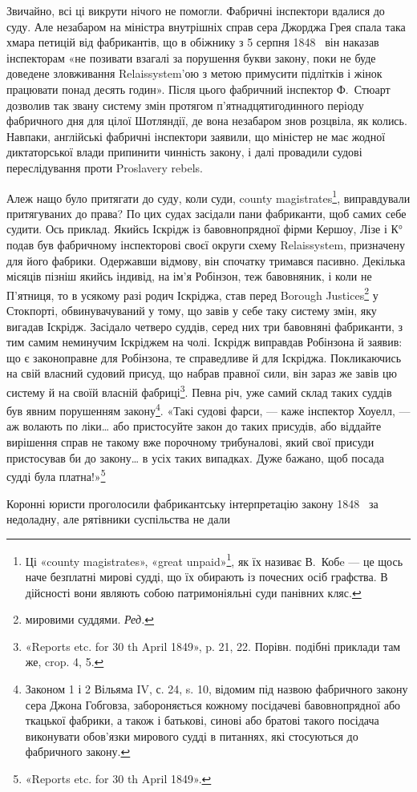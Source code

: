 
Звичайно, всі ці викрути нічого не помогли. Фабричні інспектори
вдалися до суду. Але незабаром на міністра внутрішніх
справ сера Джорджа Грея спала така хмара петицій від фабрикантів,
що в обіжнику з 5 серпня 1848~ він наказав інспекторам
«не позивати взагалі за порушення букви закону, поки не буде
доведене зловживання Relaissystem’ою з метою примусити підлітків
і жінок працювати понад десять годин». Після цього фабричний
інспектор Ф.~Стюарт дозволив так звану систему змін протягом
п’ятнадцятигодинного періоду фабричного дня для цілої Шотляндії,
де вона незабаром знов розцвіла, як колись. Навпаки,
англійські фабричні інспектори заявили, що міністер не має
жодної диктаторської влади припинити чинність закону, і далі
провадили судові переслідування проти Proslavery rebels.

Алеж нащо було притягати до суду, коли суди, county magistrates\footnote{
Ці «county magistrates», «great unpaid»\footnote*{величні неоплачувані.  \emph Ред. },
як їх називає В.~Кобe — це щось наче безплатні мирові судді, що їх обирають із почесних
осіб графства. В дійсності вони являють собою патримоніяльні суди панівних
кляс.
},
виправдували притягуваних до права? По цих судах
засідали пани фабриканти, щоб самих себе судити. Ось приклад.
Якийсь Іскрідж із бавовнопрядної фірми Кершоу, Лізе і К°
подав був фабричному інспекторові своєї округи схему Relaissystem,
призначену для його фабрики. Одержавши відмову,
він спочатку тримався пасивно. Декілька місяців пізніш якийсь
індивід, на ім’я Робінзон, теж бавовняник, і коли не П’ятниця,
то в усякому разі родич Іскріджа, став перед Borough Justices\footnote*{мировими суддями. \emph {Ред.}}
у Стокпорті, обвинувачуваний у тому, що завів у себе таку
систему змін, яку вигадав Іскрідж. Засідало четверо суддів,
серед них три бавовняні фабриканти, з тим самим неминучим
Іскріджем на чолі. Іскрідж виправдав Робінзона й заявив: що є
законоправне для Робінзона, те справедливе й для Іскріджа.
Покликаючись на свій власний судовий присуд, що набрав правної
сили, він зараз же завів цю систему й на своїй власній фабриці\footnote{
«Reports etc. for 30 th April 1849», p. 21, 22. Порівн. подібні
приклади там же, crop. 4, 5.
}.
Певна річ, уже самий склад таких суддів був явним порушенням
закону\footnote{
Законом 1 і 2 Вільяма IV, с. 24, s. 10, відомим під назвою фабричного
закону сера Джона Гобговза, забороняється кожному посідачеві
бавовнопрядної або ткацької фабрики, а також і батькові, синові або
братові такого посідача виконувати обов'язки мирового судді в питаннях,
які стосуються до фабричного закону.
}. «Такі судові фарси, — каже інспектор Хоуелл, —
аж волають по ліки\dots{} або пристосуйте закон до таких присудів,
або віддайте вирішення справ не такому вже порочному трибуналові,
який свої присуди пристосував би до закону\dots{} в усіх таких
випадках. Дуже бажано, щоб посада судді була платна!»\footnote{
«Reports etc. for 30 th April 1849».
}

Коронні юристи проголосили фабрикантську інтерпретацію
закону 1848~ за недоладну, але рятівники суспільства не дали
\parbreak{}  %
